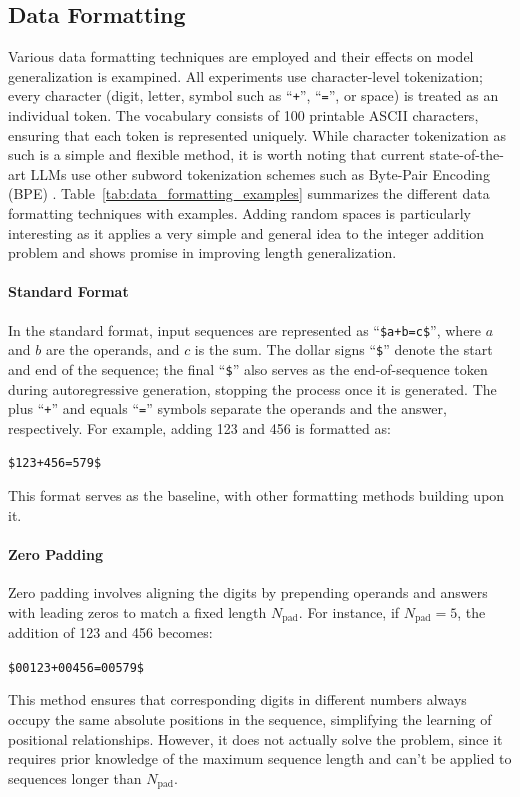 \subsection{Data Formatting}\label{subsec:data_formatting}
Various data formatting techniques are employed and their effects on model generalization is exampined. All experiments use character-level tokenization; every character (digit, letter, symbol such as ``\texttt{+}'', ``\texttt{=}'', or space) is treated as an individual token. The vocabulary consists of 100 printable ASCII characters, ensuring that each token is represented uniquely. While character tokenization as such is a simple and flexible method, it is worth noting that current state-of-the-art LLMs use other subword tokenization schemes such as Byte-Pair Encoding (BPE) \parencite{sennrich_neural_2016,brown_language_2020}. Table~\ref{tab:data_formatting_examples} summarizes the different data formatting techniques with examples. Adding random spaces is particularly interesting as it applies a very simple and general idea to the integer addition problem and shows promise in improving length generalization.


\paragraph{Standard Format}
In the standard format, input sequences are represented as ``\verb|$a+b=c$|'', where $a$ and $b$ are the operands, and $c$ is the sum. The dollar signs ``\verb|$|'' denote the start and end of the sequence; the final ``\verb|$|'' also serves as the end-of-sequence token during autoregressive generation, stopping the process once it is generated. The plus ``\verb|+|'' and equals ``\verb|=|'' symbols separate the operands and the answer, respectively. For example, adding 123 and 456 is formatted as:
\begin{center}
    \verb|$123+456=579$|
\end{center}
This format serves as the baseline, with other formatting methods building upon it.

\paragraph{Zero Padding}
Zero padding involves aligning the digits by prepending operands and answers with leading zeros to match a fixed length $N_\text{pad}$. For instance, if $N_\text{pad}=5$, the addition of 123 and 456 becomes:
\begin{center}
    \verb|$00123+00456=00579$|
\end{center}
This method ensures that corresponding digits in different numbers always occupy the same absolute positions in the sequence, simplifying the learning of positional relationships. However, it does not actually solve the problem, since it requires prior knowledge of the maximum sequence length and can't be applied to sequences longer than $N_\text{pad}$.

